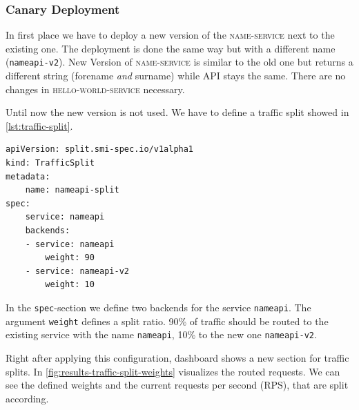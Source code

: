 \subsubsection{Canary Deployment}
\label{sec:canary-result}
In first place we have to deploy a new version of the \textsc{name-service} next to the existing one.
The deployment is done the same way but with a different name (\lstinline|nameapi-v2|).
New Version of \textsc{name-service} is similar to the old one but returns a different string (forename \textit{and} surname) while API stays the same.
There are no changes in \textsc{hello-world-service} necessary.

Until now the new version is not used.
We have to define a traffic split showed in \autoref{lst:traffic-split}.

\begin{lstlisting}[caption={YAML configuration of 90/10 traffic split. 90\% of requests are routed to \lstinline|nameapi| and 10\% to \lstinline|nameapi-v2|.}, label={lst:traffic-split}]
apiVersion: split.smi-spec.io/v1alpha1
kind: TrafficSplit
metadata:
	name: nameapi-split
spec:
	service: nameapi
	backends:
	- service: nameapi
		weight: 90
	- service: nameapi-v2
		weight: 10
\end{lstlisting}

In the \lstinline|spec|-section we define two backends for the service \lstinline|nameapi|.
The argument \lstinline|weight| defines a split ratio.
90\% of traffic should be routed to the existing service with the name \lstinline|nameapi|, 10\% to the new one \lstinline|nameapi-v2|.

Right after applying this configuration, \linkerd{} dashboard shows a new section for traffic splits.
In \autoref{fig:results-traffic-split-weights} \linkerd{} visualizes the routed requests.
We can see the defined weights and the current requests per second (RPS), that are split according.

